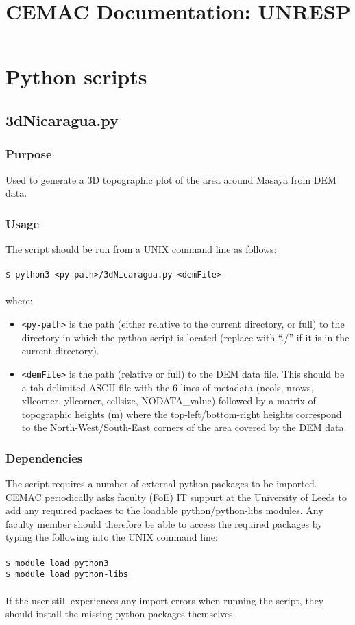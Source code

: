 \documentclass[10pt,a4paper]{article}
\title{CEMAC Documentation: UNRESP}
\newcommand\tab[1][0.5cm]{\hspace*{#1}}
\begin{document}
\maketitle
\tableofcontents

\section{Python scripts}

\subsection{3dNicaragua.py}

\subsubsection{Purpose}

Used to generate a 3D topographic plot of the area around Masaya from DEM data.

\subsubsection{Usage}
The script should be run from a UNIX command line as follows:\\\\
\tab \texttt{\$ python3 <py-path>/3dNicaragua.py <demFile>}\\\\
where:
\begin{itemize}
\item \texttt{<py-path>} is the path (either relative to the current directory, or full) to the directory in which the python script is located (replace with “./” if it is in the current directory).
\item \texttt{<demFile>} is the path (relative or full) to the DEM data file. This should be a tab delimited ASCII file with the 6 lines of metadata (ncols, nrows, xllcorner, yllcorner, cellsize, NODATA\_value) followed by a matrix of topographic heights (m) where the top-left/bottom-right heights correspond to the North-West/South-East corners of the area covered by the DEM data.
\end{itemize}

\subsubsection{Dependencies}
The script requires a number of external python packages to be imported. CEMAC periodically asks faculty (FoE) IT suppurt at the University of Leeds to add any required packaes to the loadable python/python-libs modules. Any faculty member should therefore be able to access the required packages by typing the following into the UNIX command line:\\\\
\tab \texttt{\$ module load python3}\\
\tab \texttt{\$ module load python-libs}\\\\
If the user still experiences any import errors when running the script, they should install the missing python packages themselves.
\end{document}
